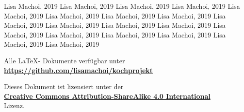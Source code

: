 \documentclass[10pt,a4paper]{article}
\begin{document}
\newpage
\renewcommand{\refname}{\textsc{Bilderverzeichnis}}
\begin{thebibliography}{9}

	 Lisa Machoi, 2019
	 Lisa Machoi, 2019
	 Lisa Machoi, 2019
	 Lisa Machoi, 2019	
	 Lisa Machoi, 2019
	 Lisa Machoi, 2019
	 Lisa Machoi, 2019
	 Lisa Machoi, 2019
	 Lisa Machoi, 2019
	 Lisa Machoi, 2019
	 Lisa Machoi, 2019
	 Lisa Machoi, 2019
	 Lisa Machoi, 2019
	 Lisa Machoi, 2019
	 Lisa Machoi, 2019
	 Lisa Machoi, 2019
	 Lisa Machoi, 2019
	 Lisa Machoi, 2019

\end{thebibliography}
	\vspace{2cm}
\begin{center}
	Alle \LaTeX - Dokumente verfügbar unter\\ \href{https://github.com/lisamachoi/kochprojekt}{\textbf{https://github.com/lisamachoi/kochprojekt}}
	
	\vspace{2cm}
	
	Dieses Dokument ist lizensiert unter der\\ \href{https://creativecommons.org/licenses/by-sa/4.0/}{\textbf{Creative Commons Attribution-ShareAlike 4.0 International}}\\
	Lizenz.

	\vspace{1cm}

	{\huge\ccbysa}
\end{center}
\end{document}
